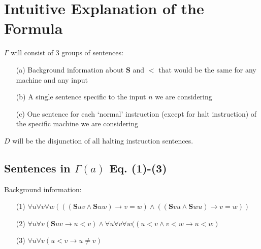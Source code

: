 \documentclass[
11pt,notheorems,hyperref={pdfauthor=whatever}
]{beamer}
\begin{document}
\section{Intuitive Explanation of the Formula}
\begin{frame}
$\Gamma$ will consist of 3 groups of sentences:
\begin{enumerate}
    \setlength\itemsep{0.5em}
    \item[(a)] Background information about $\pmb{S}$ and $\pmb{<}$ that would be the same for any machine and any input
    \item[(b)] A single sentence specific to the input $n$ we are considering
    \item[(c)] One sentence for each ‘normal’ instruction (except for halt instruction) of the specific machine we are considering
\end{enumerate}
\vspace{3em}
$D$ will be the disjunction of all halting instruction sentences.
\end{frame}

\subsection{Sentences in $\Gamma(a)$ Eq. (1)-(3)}
\begin{frame}
Background information:
\vspace{3em}
\begin{enumerate}
    \setlength\itemsep{1em}
    \item[(1)] $\forall u\forall v\forall w(((\pmb{S}uv \wedge \pmb{S}uw) \to v = w) \wedge ((\pmb{S}vu \wedge \pmb{S}wu) \to v = w))$
    \item[(2)] $\forall u\forall v(\pmb{S}uv \to u \pmb{<} v) \wedge \forall u\forall v\forall w((u \pmb{<} v \wedge v \pmb{<} w \to u \pmb{<} w)$
    \item[(3)] $\forall u\forall v(u\pmb{<}v \to u \pmb{\neq} v)$
\end{enumerate}
\end{frame}
\end{document}
